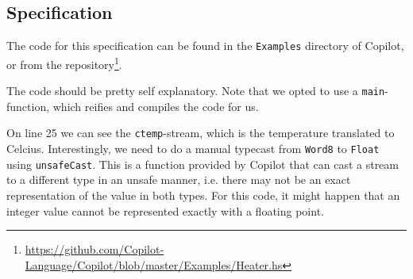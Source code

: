 \subsection{Specification}
The code for this specification can be found in the \texttt{Examples} directory
of Copilot, or from the
repository\footnote{\url{https://github.com/Copilot-Language/Copilot/blob/master/Examples/Heater.hs}}.


%
%
%
%
%
%
%
%
The code should be pretty self explanatory. Note that we opted to use a
\texttt{main}-function, which reifies and compiles the code for us.

On line 25 we can see the \texttt{ctemp}-stream, which is the temperature
translated to Celcius. Interestingly, we need to do a manual typecast from
\texttt{Word8} to \texttt{Float} using \texttt{unsafeCast}. This is a function
provided by Copilot that can cast a stream to a different type in an unsafe
manner, i.e. there may not be an exact representation of the value in both
types. For this code, it might happen that an integer value cannot be
represented exactly with a floating point.

